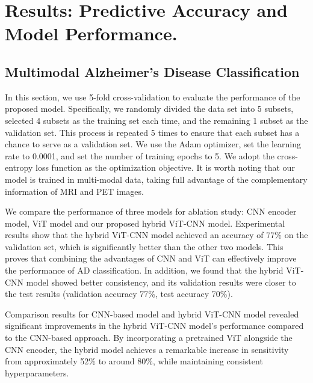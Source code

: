 \section{Results: Predictive Accuracy and Model Performance.}
\label{sec:results}
\subsection{Multimodal Alzheimer's Disease Classification}
In this section, we use 5-fold cross-validation to evaluate the performance of the proposed model. Specifically, we randomly divided the data set into 5 subsets, selected 4 subsets as the training set each time, and the remaining 1 subset as the validation set. This process is repeated 5 times to ensure that each subset has a chance to serve as a validation set. We use the Adam optimizer, set the learning rate to 0.0001, and set the number of training epochs to 5. We adopt the cross-entropy loss function as the optimization objective. It is worth noting that our model is trained in multi-modal data, taking full advantage of the complementary information of MRI and PET images. 

We compare the performance of three models for ablation study: CNN encoder model, ViT model and our proposed hybrid ViT-CNN model. Experimental results show that the hybrid ViT-CNN model achieved an accuracy of 77\% on the validation set, which is significantly better than the other two models. This proves that combining the advantages of CNN and ViT can effectively improve the performance of AD classification. In addition, we found that the hybrid ViT-CNN model showed better consistency, and its validation results were closer to the test results (validation accuracy 77\%, test accuracy 70\%). 

Comparison results for CNN-based model and hybrid ViT-CNN model revealed significant improvements in the hybrid ViT-CNN model's performance compared to the CNN-based approach. By incorporating a pretrained ViT alongside the CNN encoder, the hybrid model achieves a remarkable increase in sensitivity from approximately 52\% to around 80\%, while maintaining consistent hyperparameters. 
    
